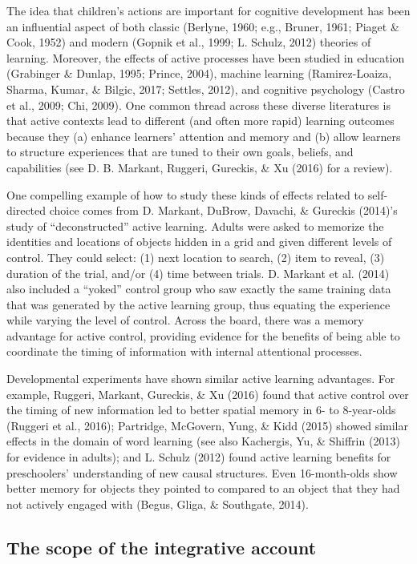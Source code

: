 \documentclass[oneside]{report}
\begin{document}
The idea that children's actions are important for cognitive development
has been an influential aspect of both classic (Berlyne, 1960; e.g.,
Bruner, 1961; Piaget \& Cook, 1952) and modern (Gopnik et al., 1999; L.
Schulz, 2012) theories of learning. Moreover, the effects of active
processes have been studied in education (Grabinger \& Dunlap, 1995;
Prince, 2004), machine learning (Ramirez-Loaiza, Sharma, Kumar, \&
Bilgic, 2017; Settles, 2012), and cognitive psychology (Castro et al.,
2009; Chi, 2009). One common thread across these diverse literatures is
that active contexts lead to different (and often more rapid) learning
outcomes because they (a) enhance learners' attention and memory and (b)
allow learners to structure experiences that are tuned to their own
goals, beliefs, and capabilities (see D. B. Markant, Ruggeri, Gureckis,
\& Xu (2016) for a review).

One compelling example of how to study these kinds of effects related to
self-directed choice comes from D. Markant, DuBrow, Davachi, \& Gureckis
(2014)'s study of ``deconstructed'' active learning. Adults were asked
to memorize the identities and locations of objects hidden in a grid and
given different levels of control. They could select: (1) next location
to search, (2) item to reveal, (3) duration of the trial, and/or (4)
time between trials. D. Markant et al. (2014) also included a ``yoked''
control group who saw exactly the same training data that was generated
by the active learning group, thus equating the experience while varying
the level of control. Across the board, there was a memory advantage for
active control, providing evidence for the benefits of being able to
coordinate the timing of information with internal attentional
processes.

Developmental experiments have shown similar active learning advantages.
For example, Ruggeri, Markant, Gureckis, \& Xu (2016) found that active
control over the timing of new information led to better spatial memory
in 6- to 8-year-olds (Ruggeri et al., 2016); Partridge, McGovern, Yung,
\& Kidd (2015) showed similar effects in the domain of word learning
(see also Kachergis, Yu, \& Shiffrin (2013) for evidence in adults); and
L. Schulz (2012) found active learning benefits for preschoolers'
understanding of new causal structures. Even 16-month-olds show better
memory for objects they pointed to compared to an object that they had
not actively engaged with (Begus, Gliga, \& Southgate, 2014).

\subsection{The scope of the integrative
account}\label{the-scope-of-the-integrative-account}
\end{document}
